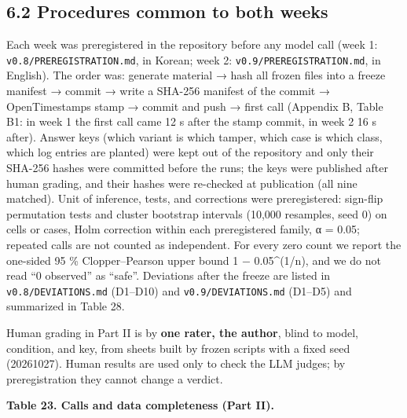 \documentclass[10pt]{article}
\begin{document}
\subsection{6.2 Procedures common to both weeks}\label{procedures-common-to-both-weeks}

Each week was preregistered in the repository before any model call (week 1: \texttt{v0.\allowbreak{}8/\allowbreak{}PREREGISTRATION.\allowbreak{}md}, in Korean; week 2: \texttt{v0.\allowbreak{}9/\allowbreak{}PREREGISTRATION.\allowbreak{}md}, in English). The order was: generate material → hash all frozen files into a freeze manifest → commit → write a SHA-256 manifest of the commit → OpenTimestamps stamp → commit and push → first call (Appendix B, Table B1: in week 1 the first call came 12 s after the stamp commit, in week 2 16 s after). Answer keys (which variant is which tamper, which case is which class, which log entries are planted) were kept out of the repository and only their SHA-256 hashes were committed before the runs; the keys were published after human grading, and their hashes were re-checked at publication (all nine matched). Unit of inference, tests, and corrections were preregistered: sign-flip permutation tests and cluster bootstrap intervals (10,000 resamples, seed 0) on cells or cases, Holm correction within each preregistered family, α = 0.05; repeated calls are not counted as independent. For every zero count we report the one-sided 95 \% Clopper--Pearson upper bound 1 − 0.05\^{}(1/n), and we do not read ``0 observed'' as ``safe''. Deviations after the freeze are listed in \texttt{v0.\allowbreak{}8/\allowbreak{}DEVIATIONS.\allowbreak{}md} (D1--D10) and \texttt{v0.\allowbreak{}9/\allowbreak{}DEVIATIONS.\allowbreak{}md} (D1--D5) and summarized in Table 28.

Human grading in Part II is by \textbf{one rater, the author}, blind to model, condition, and key, from sheets built by frozen scripts with a fixed seed (20261027). Human results are used only to check the LLM judges; by preregistration they cannot change a verdict.

\textbf{Table 23. Calls and data completeness (Part II).}
\end{document}
